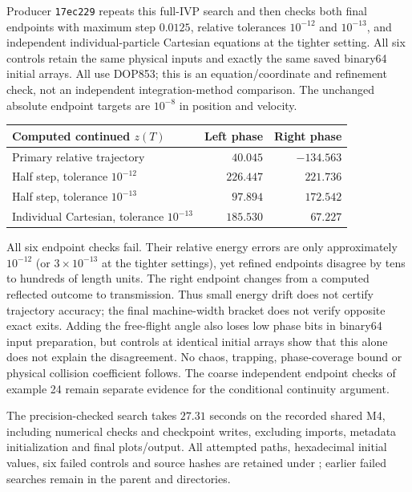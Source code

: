 \documentclass[11pt,letterpaper]{article}
\begin{document}
Producer \texttt{17ec229} repeats this full-IVP search and then checks both
final endpoints with maximum step $0.0125$, relative tolerances $10^{-12}$
and $10^{-13}$, and independent individual-particle Cartesian equations
at the tighter setting. All six controls retain the same physical inputs
and exactly the same saved binary64 initial arrays. All use DOP853; this
is an equation/coordinate and refinement check, not an independent
integration-method comparison. The unchanged absolute endpoint targets
are $10^{-8}$ in position and velocity.
\begin{center}
\begin{tabular}{lrr}
\toprule
Computed continued $z(T)$ & Left phase & Right phase\\
\midrule
Primary relative trajectory & $40.045$ & $-134.563$\\
Half step, tolerance $10^{-12}$ & $226.447$ & $221.736$\\
Half step, tolerance $10^{-13}$ & $97.894$ & $172.542$\\
Individual Cartesian, tolerance $10^{-13}$ & $185.530$ & $67.227$\\
\bottomrule
\end{tabular}
\end{center}
All six endpoint checks fail. Their relative energy errors are only
approximately $10^{-12}$ (or $3\times10^{-13}$ at the tighter settings),
yet refined endpoints disagree by tens to hundreds of length units.
The right endpoint changes from a computed reflected outcome to
transmission. Thus small energy drift does not certify trajectory accuracy;
the final machine-width bracket does not verify opposite exact exits.
Adding the free-flight angle also loses low phase bits in binary64 input
preparation, but controls at identical initial arrays show that this alone
does not explain the disagreement. No chaos, trapping, phase-coverage bound
or physical collision coefficient follows. The coarse independent endpoint
checks of example 24 remain separate evidence for the conditional
continuity argument.

The precision-checked search takes $27.31$ seconds on the recorded shared
M4, including numerical checks and checkpoint writes, excluding imports,
metadata initialization and final plots/output. All attempted paths,
hexadecimal initial values, six failed controls and source hashes are
retained under ; earlier
failed searches remain in the parent and  directories.
\end{document}
